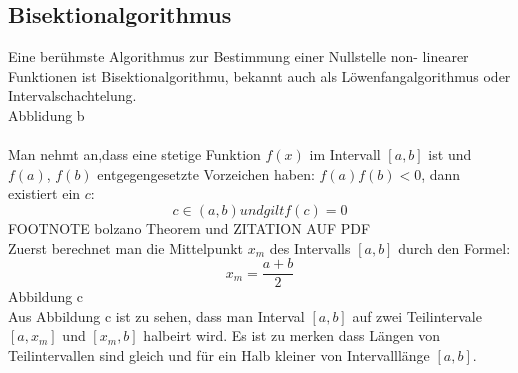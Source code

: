 \subsection{Bisektionalgorithmus}
Eine berühmste Algorithmus zur Bestimmung  einer Nullstelle non- linearer Funktionen ist Bisektionalgorithmu, bekannt auch als Löwenfangalgorithmus oder Intervalschachtelung.
\\
Abblidung b
\\
\\
Man nehmt an,dass eine stetige Funktion $f(x)$ im Intervall $[a,b]$ ist 
und  $f(a)$, $f(b)$ entgegengesetzte Vorzeichen haben: $f(a)f(b)<0$, dann existiert ein $c$:
$$c \in (a,b) und gilt f(c)=0$$ FOOTNOTE bolzano Theorem und ZITATION AUF PDF\\

Zuerst berechnet man die Mittelpunkt $x_m$ des Intervalls $[a,b]$ durch den Formel:
$$ x_m = \frac{a+b}{2}$$
Abbildung c
\\
Aus Abbildung c ist zu sehen, dass man Interval $[a,b]$ auf zwei Teilintervale $[a,x_m]$ und $[x_m,b]$ halbeirt wird. Es ist zu merken dass Längen von Teilintervallen sind gleich und für ein Halb kleiner von Intervalllänge $[a,b]$.

